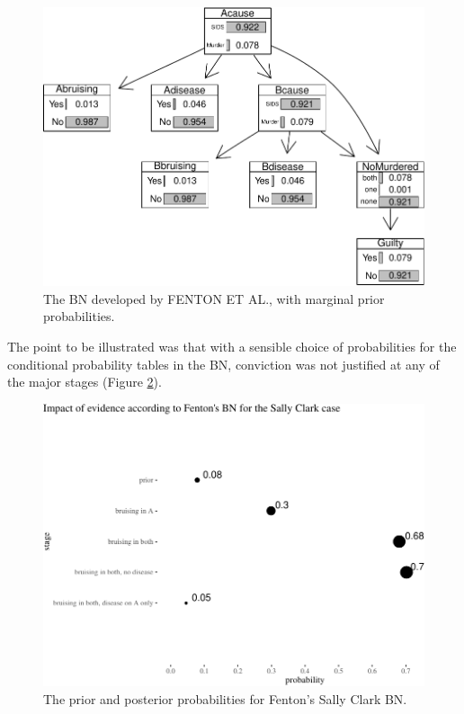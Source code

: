 \documentclass[
  10pt,
  dvipsnames,enabledeprecatedfontcommands]{scrartcl}
\begin{document}
\begin{figure}[H]

\begin{center}\includegraphics[width=0.8\linewidth]{chapter-outline_files/figure-latex/scBNplot2-1} \end{center}
\caption{The BN developed by FENTON ET AL., with marginal prior probabilities.}
\label{fig:scBNplot}
\end{figure}

The point to be illustrated was that with a sensible choice of
probabilities for the conditional probability tables in the BN,
conviction was not justified at any of the major stages (Figure
\ref{fig:SCfentonTable}).

\begin{figure}[H]

\begin{center}\includegraphics[width=1\linewidth]{chapter-outline_files/figure-latex/SCfentonTable2-1} \end{center}

\caption{The prior and posterior probabilities for Fenton's Sally Clark BN.}

\label{fig:SCfentonTable}

\end{figure}
\end{document}
